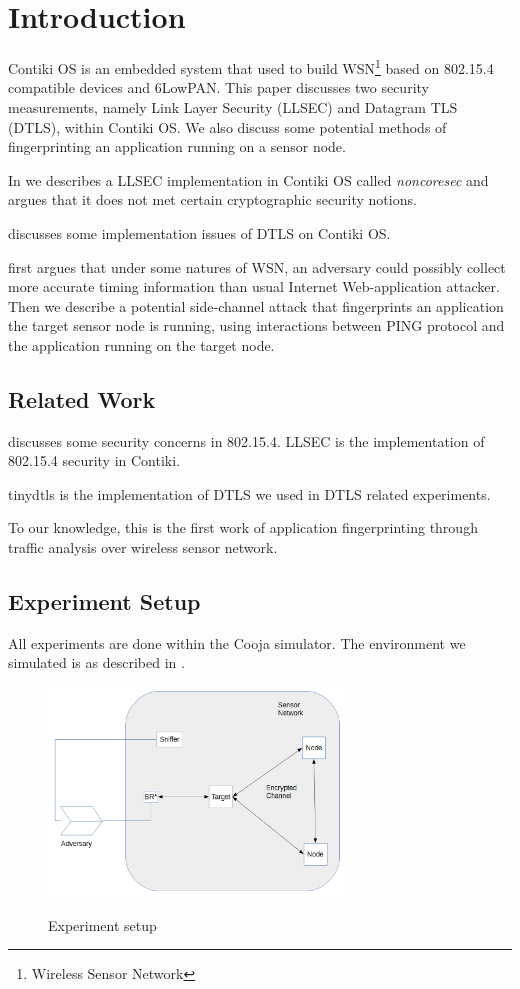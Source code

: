 \chapter{Introduction}
Contiki OS is an embedded system that used to build WSN\footnote{Wireless Sensor Network} based on 802.15.4\cite{802154} compatible devices and 6LowPAN\cite{rfc4944}. This paper discusses two security measurements, namely Link Layer Security (LLSEC) and Datagram TLS (DTLS), within Contiki OS. We also discuss some potential methods of fingerprinting an application running on a sensor node.

In  we describes a LLSEC implementation in Contiki OS called \textit{noncoresec} and argues that it does not met certain cryptographic security notions.

 discusses some implementation issues of DTLS on Contiki OS.

 first argues that under some natures of WSN, an adversary could possibly collect more accurate timing information than usual Internet Web-application attacker. Then we describe a potential side-channel attack that fingerprints an application the target sensor node is running, using interactions between PING protocol and the application running on the target node.

\section{Related Work}
\cite{802154Sec} discusses some security concerns in 802.15.4.  LLSEC\cite{LLSEC} is the implementation of 802.15.4 security in Contiki.

tinydtls\cite{tinydtls} is the implementation of DTLS we used in DTLS related experiments.

To our knowledge, this is the first work of application fingerprinting through traffic analysis over wireless sensor network.

\section{Experiment Setup}
All experiments are done within the Cooja simulator. The environment we simulated is as described in .

\begin{figure}
\centering
{
	\includegraphics[width=0.7\textwidth,]{fig/setup.png}
}
\caption{Experiment setup} \label{fig: Setup}
\end{figure}

